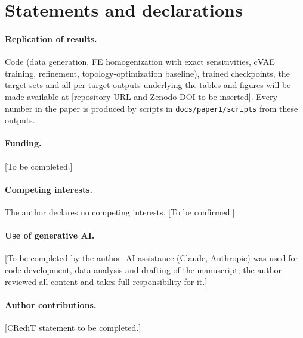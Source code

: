 \documentclass[a4paper,11pt]{article}
\begin{document}
\section*{Statements and declarations}

\paragraph{Replication of results.}
Code (data generation, FE homogenization with exact sensitivities, cVAE
training, refinement, topology-optimization baseline), trained checkpoints,
the target sets and all per-target outputs underlying the tables and figures
will be made available at [repository URL and Zenodo DOI to be inserted].
Every number in the paper is produced by scripts in
\texttt{docs/paper1/scripts} from these outputs.

\paragraph{Funding.} [To be completed.]

\paragraph{Competing interests.} The author declares no competing
interests. [To be confirmed.]

\paragraph{Use of generative AI.} [To be completed by the author: AI
assistance (Claude, Anthropic) was used for code development, data analysis
and drafting of the manuscript; the author reviewed all content and takes
full responsibility for it.]

\paragraph{Author contributions.} [CRediT statement to be completed.]



\end{document}
